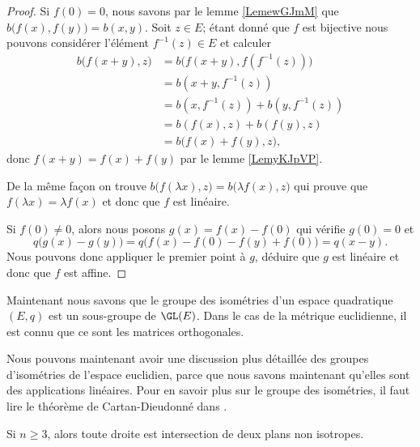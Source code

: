 \begin{proof}
    Si \( f(0)=0\), nous savons par le lemme \ref{LemewGJmM} que \( b\big( f(x),f(y) \big)=b(x,y)\). Soit \( z\in E\); étant donné que \( f\) est bijective nous pouvons considérer l'élément \( f^{-1}(z)\in E\) et calculer
    \begin{subequations}
        \begin{align}
            b\big( f(x+y),z \big)&=b\big( f(x+y),f(f^{-1}(z)) \big)\\
            &=b(x+y,f^{-1}(z))\\
            &=b(x,f^{-1}(z))+b(y,f^{-1}(z))\\
            &=b(f(x),z)+b(f(y),z)\\
            &=b\big( f(x)+f(y),z \big),
        \end{align}
    \end{subequations}
    donc \( f(x+y)=f(x)+f(y)\) par le lemme \ref{LemyKJpVP}. 

    De la même façon on trouve \( b\big( f(\lambda x),z \big)=b\big( \lambda f(x),z \big)\) qui prouve que \( f(\lambda x)=\lambda f(x)\) et donc que \( f\) est linéaire.

    Si \( f(0)\neq 0\), alors nous posons \( g(x)=f(x)-f(0)\) qui vérifie \( g(0)=0\) et
    \begin{equation}
        q\big( g(x)-g(y) \big)=q\big( f(x)-f(0)-f(y)+f(0) \big)=q(x-y).
    \end{equation}
    Nous pouvons donc appliquer le premier point à \( g\), déduire que \( g\) est linéaire et donc que \( f\) est affine.
\end{proof}

Maintenant nous savons que le groupe des isométries d'un espace quadratique \( (E,q)\) est un sous-groupe de \( \GL(E)\). Dans le cas de la métrique euclidienne, il est connu que ce sont les matrices orthogonales.

Nous pouvons maintenant avoir une discussion plus détaillée des groupes d'isométries de l'espace euclidien, parce que nous savons maintenant qu'elles sont des applications linéaires. Pour en savoir plus sur le groupe des isométries, il faut lire le théorème de Cartan-Dieudonné dans \cite{JGAdTA}.



\begin{lemma}
    Si \( n\geq 3\), alors toute droite est intersection de deux plans non isotropes.
\end{lemma}


